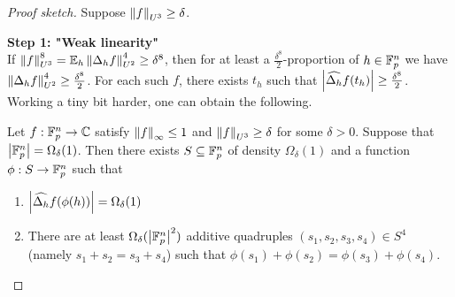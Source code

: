 \documentclass{article}
\begin{document}
\begin{proof}[Proof sketch]
  Suppose $\left\lVert f\right\rVert_{U^3} \ge \delta$.

  {\bf Step 1: "Weak linearity"} \\
  If $\norm f_{U^3}^8 = \E_h \norm{\Delta_h f}_{U^2}^4 \ge \delta^8$, then for at least a $\frac{\delta^8}2$-proportion of $h \in \mathbb F_p^n$ we have $\left\lVert \Delta_h f\right\rVert_{U^2}^4 \ge \frac{\delta^8}2$. For each such $f$, there exists $t_h$ such that $\left\lvert \widehat{\Delta_h}f(t_h)\right\rvert \ge \frac{\delta^8}2$. Working a tiny bit harder, one can obtain the following.

  \begin{prop}\label{prop:weak-linearity}
    Let $f : \mathbb F_p^n \to \mathbb C$ satisfy $\left\lVert f\right\rVert_\infty \le 1$ and $\left\lVert f\right\rVert_{U^3} \ge \delta$ for some $\delta > 0$. Suppose that $\left\lvert \mathbb F_p^n\right\rvert = \Omega_\delta(1)$. Then there exists $S \subseteq \mathbb F_p^n$ of density $\Omega_\delta(1)$ and a function $\phi : S \to \mathbb F_p^n$ such that
    \begin{enumerate}
      \item $\left\lvert \widehat{\Delta_h}f(\phi(h))\right\rvert = \Omega_\delta(1)$
      \item There are at least $\Omega_\delta(\left\lvert \mathbb F_p^n\right\rvert^2)$ additive quadruples $(s_1, s_2, s_3, s_4) \in S^4$ (namely $s_1 + s_2 = s_3 + s_4$) such that $\phi(s_1) + \phi(s_2) = \phi(s_3) + \phi(s_4)$.
    \end{enumerate}
  \end{prop}


\end{proof}
\end{document}
